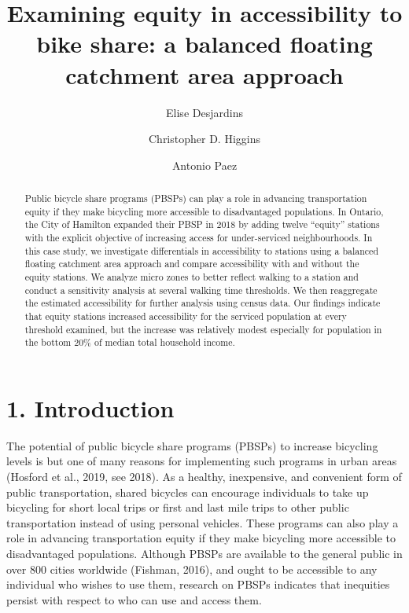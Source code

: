 \documentclass[]{elsarticle} %
\begin{document}
\begin{frontmatter}

  \title{Examining equity in accessibility to bike share: a balanced
floating catchment area approach}
    \author[McMaster University]{Elise Desjardins}
    \author[University of Toronto Scarborough]{Christopher D. Higgins}
    \author[McMaster University]{Antonio Paez}
      \address[McMaster University]{School of Earth, Environment \&
Society, McMaster University, 1280 Main Street West, Hamilton, ON
L8S4L8}
    \address[University of Toronto Scarborough]{Department of Geography
\& Planning, University of Toronto Scarborough, 1265 Military Trail,
Toronto, ON M1C1A4}
  
  \begin{abstract}
  Public bicycle share programs (PBSPs) can play a role in advancing
  transportation equity if they make bicycling more accessible to
  disadvantaged populations. In Ontario, the City of Hamilton expanded
  their PBSP in 2018 by adding twelve ``equity'' stations with the
  explicit objective of increasing access for under-serviced
  neighbourhoods. In this case study, we investigate differentials in
  accessibility to stations using a balanced floating catchment area
  approach and compare accessibility with and without the equity
  stations. We analyze micro zones to better reflect walking to a
  station and conduct a sensitivity analysis at several walking time
  thresholds. We then reaggregate the estimated accessibility for
  further analysis using census data. Our findings indicate that equity
  stations increased accessibility for the serviced population at every
  threshold examined, but the increase was relatively modest especially
  for population in the bottom 20\% of median total household income.
  \end{abstract}
  
 \end{frontmatter}

\newpage

\hypertarget{introduction}{%
\section{1. Introduction}\label{introduction}}

The potential of public bicycle share programs (PBSPs) to increase
bicycling levels is but one of many reasons for implementing such
programs in urban areas (Hosford et al., 2019, see 2018). As a healthy,
inexpensive, and convenient form of public transportation, shared
bicycles can encourage individuals to take up bicycling for short local
trips or first and last mile trips to other public transportation
instead of using personal vehicles. These programs can also play a role
in advancing transportation equity if they make bicycling more
accessible to disadvantaged populations. Although PBSPs are available to
the general public in over 800 cities worldwide (Fishman, 2016), and
ought to be accessible to any individual who wishes to use them,
research on PBSPs indicates that inequities persist with respect to who
can use and access them.
\end{document}
